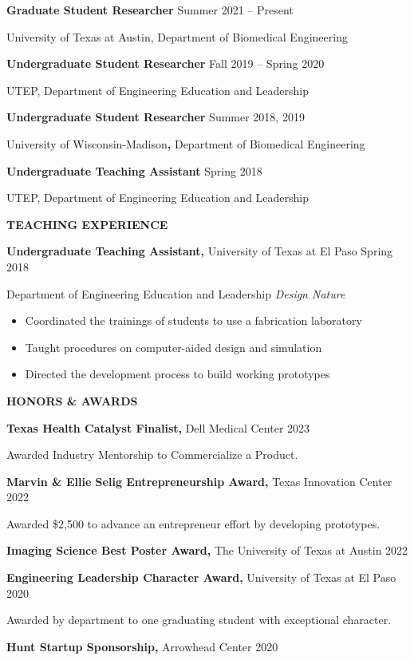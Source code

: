 \documentclass[
]{article}
\begin{document}
\textbf{Graduate Student Researcher} Summer 2021 -- Present

University of Texas at Austin, Department of Biomedical Engineering

\textbf{Undergraduate Student Researcher} Fall 2019 -- Spring 2020

UTEP, Department of Engineering Education and Leadership

\textbf{Undergraduate Student Researcher} Summer 2018, 2019

University of Wisconsin-Madison\textbf{,} Department of Biomedical Engineering

\textbf{Undergraduate Teaching Assistant} Spring 2018

UTEP, Department of Engineering Education and Leadership

\textbf{TEACHING EXPERIENCE}

\textbf{Undergraduate Teaching Assistant,} University of Texas at El Paso Spring 2018

Department of Engineering Education and Leadership \textbar{} \emph{Design Nature}

\begin{itemize}
\item
  Coordinated the trainings of students to use a fabrication laboratory
\item
  Taught procedures on computer-aided design and simulation
\item
  Directed the development process to build working prototypes
\end{itemize}

\textbf{HONORS \& AWARDS}

\textbf{Texas Health Catalyst Finalist,} Dell Medical Center 2023

Awarded Industry Mentorship to Commercialize a Product.

\textbf{Marvin \& Ellie Selig Entrepreneurship Award,} Texas Innovation Center 2022

Awarded \$2,500 to advance an entrepreneur effort by developing prototypes.

\textbf{Imaging Science Best Poster Award,} The University of Texas at Austin 2022

\textbf{Engineering Leadership Character Award,} University of Texas at El Paso 2020

Awarded by department to one graduating student with exceptional character.

\textbf{Hunt Startup Sponsorship,} Arrowhead Center 2020
\end{document}

